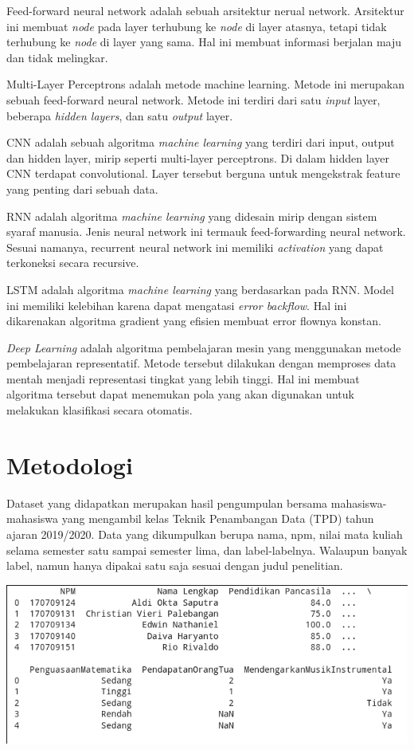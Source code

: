 \documentclass[12pt, a4paper]{article}
\begin{document}
\begin{multicols}{2}
Feed-forward neural network adalah sebuah arsitektur nerual network. Arsitektur ini membuat \textit{node} pada layer terhubung ke \textit{node} di layer atasnya, tetapi tidak terhubung ke \textit{node} di layer yang sama. Hal ini membuat informasi berjalan maju dan tidak melingkar. \cite{Schmidt.1992}

Multi-Layer Perceptrons adalah metode machine learning. Metode ini merupakan sebuah feed-forward neural network. Metode ini terdiri dari satu \textit{input} layer, beberapa \textit{hidden layers}, dan satu \textit{output} layer. \cite{Riedmiller.1994}

CNN adalah sebuah algoritma \textit{machine learning} yang terdiri dari input, output dan hidden layer, mirip seperti multi-layer perceptrons. Di dalam hidden layer CNN terdapat convolutional. Layer tersebut berguna untuk mengekstrak feature yang penting dari sebuah data. \cite{Valueva.2020}

RNN adalah algoritma \textit{machine learning} yang didesain mirip dengan sistem syaraf manusia. Jenis neural network ini termauk feed-forwarding neural network. Sesuai namanya, recurrent neural network ini memiliki \textit{activation} yang dapat terkoneksi secara recursive. \cite{Lukosevicius.2009}

LSTM adalah algoritma \textit{machine learning} yang berdasarkan pada RNN. Model ini memiliki kelebihan karena dapat mengatasi \textit{error backflow}. Hal ini dikarenakan algoritma gradient yang efisien membuat error flownya konstan. \cite{Hochreiter.1997}

\textit{Deep Learning} adalah algoritma pembelajaran mesin yang menggunakan metode pembelajaran representatif. Metode tersebut dilakukan dengan memproses data mentah menjadi representasi tingkat yang lebih tinggi. Hal ini membuat algoritma tersebut dapat menemukan pola yang akan digunakan untuk melakukan klasifikasi secara otomatis. \cite{LeCun.2015}

\section{Metodologi}
Dataset yang didapatkan merupakan hasil pengumpulan bersama mahasiswa-mahasiswa yang mengambil kelas Teknik Penambangan Data (TPD) tahun ajaran 2019/2020. Data yang dikumpulkan berupa nama, npm, nilai mata kuliah selama semester satu sampai semester lima, dan label-labelnya. Walaupun banyak label, namun hanya dipakai satu saja sesuai dengan judul penelitian.

\centering
\vspace{0.2cm}
\includegraphics[scale=0.28]{see_data}
\vspace{0.2cm}


\end{multicols}
\end{document}
